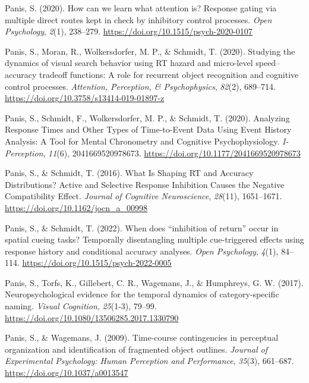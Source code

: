 \documentclass[
  man, donotrepeattitle,floatsintext]{apa6}
\newlength{\cslhangindent}
\newenvironment{CSLReferences}[2] %
 {\begin{list}{}{%
  \setlength{\itemindent}{0pt}
  \setlength{\leftmargin}{0pt}
  \setlength{\parsep}{0pt}
  \ifodd #1
   \setlength{\leftmargin}{\cslhangindent}
   \setlength{\itemindent}{-1\cslhangindent}
  \fi
  \setlength{\itemsep}{#2\baselineskip}}}
 {\end{list}}
\begin{document}
\begin{CSLReferences}{1}{0}
Panis, S. (2020). How can we learn what attention is? {Response} gating via multiple direct routes kept in check by inhibitory control processes. \emph{Open Psychology}, \emph{2}(1), 238--279. \url{https://doi.org/10.1515/psych-2020-0107}

Panis, S., Moran, R., Wolkersdorfer, M. P., \& Schmidt, T. (2020). Studying the dynamics of visual search behavior using {RT} hazard and micro-level speed--accuracy tradeoff functions: {A} role for recurrent object recognition and cognitive control processes. \emph{Attention, Perception, \& Psychophysics}, \emph{82}(2), 689--714. \url{https://doi.org/10.3758/s13414-019-01897-z}

Panis, S., Schmidt, F., Wolkersdorfer, M. P., \& Schmidt, T. (2020). Analyzing {Response Times} and {Other Types} of {Time-to-Event Data Using Event History Analysis}: {A Tool} for {Mental Chronometry} and {Cognitive Psychophysiology}. \emph{I-Perception}, \emph{11}(6), 2041669520978673. \url{https://doi.org/10.1177/2041669520978673}

Panis, S., \& Schmidt, T. (2016). What {Is Shaping RT} and {Accuracy Distributions}? {Active} and {Selective Response Inhibition Causes} the {Negative Compatibility Effect}. \emph{Journal of Cognitive Neuroscience}, \emph{28}(11), 1651--1671. \url{https://doi.org/10.1162/jocn_a_00998}

Panis, S., \& Schmidt, T. (2022). When does {``inhibition of return''} occur in spatial cueing tasks? {Temporally} disentangling multiple cue-triggered effects using response history and conditional accuracy analyses. \emph{Open Psychology}, \emph{4}(1), 84--114. \url{https://doi.org/10.1515/psych-2022-0005}

Panis, S., Torfs, K., Gillebert, C. R., Wagemans, J., \& Humphreys, G. W. (2017). Neuropsychological evidence for the temporal dynamics of category-specific naming. \emph{Visual Cognition}, \emph{25}(1-3), 79--99. \url{https://doi.org/10.1080/13506285.2017.1330790}

Panis, S., \& Wagemans, J. (2009). Time-course contingencies in perceptual organization and identification of fragmented object outlines. \emph{Journal of Experimental Psychology: Human Perception and Performance}, \emph{35}(3), 661--687. \url{https://doi.org/10.1037/a0013547}


\end{CSLReferences}
\end{document}
